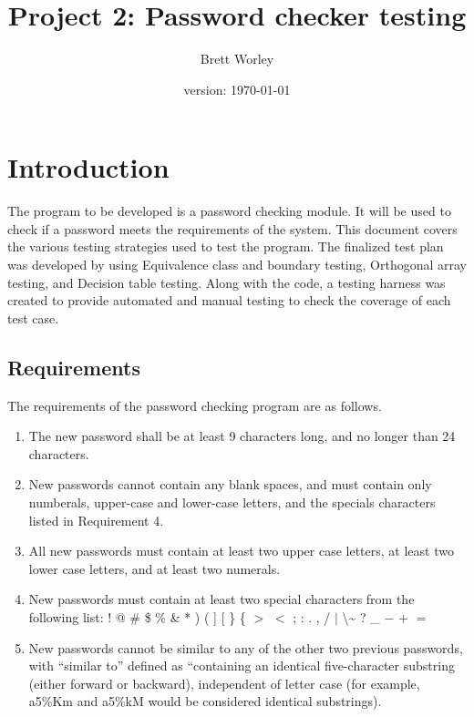\documentclass[12pt,letterpaper]{article}
\author{Brett Worley}
\title{Project 2: Password checker testing}
\date{version: \today}
\begin{document}
\maketitle
\tableofcontents



\section{Introduction}

The program to be developed is a password checking module. It will be used to check if a password
meets the requirements of the system. This document covers the various testing strategies
used to test the program. The finalized test plan was developed by using Equivalence class
and boundary testing, Orthogonal array testing, and Decision table testing. Along
with the code, a testing harness was created to provide automated and manual testing to check
the coverage of each test case.

\subsection{Requirements}

The requirements of the password checking program are as follows.

\begin{enumerate}

\item The new password shall be at least 9 characters long, and no longer than
24 characters.
\item New passwords cannot contain any blank spaces, and must contain only numberals, upper-case and lower-case letters, and
the specials characters listed in Requirement 4.
\item All new passwords must contain at least two upper case letters, at least two lower case
letters, and at least two numerals.
\item New passwords must contain at least two special characters from the following list: 
  !  @  \#  \$  \%  \&  *  )  (  ]  [  \}  \{  $>$  $<$  ; 
   :  .  ,  /  $|$   \textbackslash  \~{}  ?  \_  $-$  $+$  $=$ 

\item New passwords cannot be similar to any of the other two previous passwords, with ``similar to'' defined
as ``containing an identical five-character substring (either forward or backward), independent of letter
case (for example, a5\%Km and a5\%kM would be considered identical substrings).

\end{enumerate}
\end{document}
